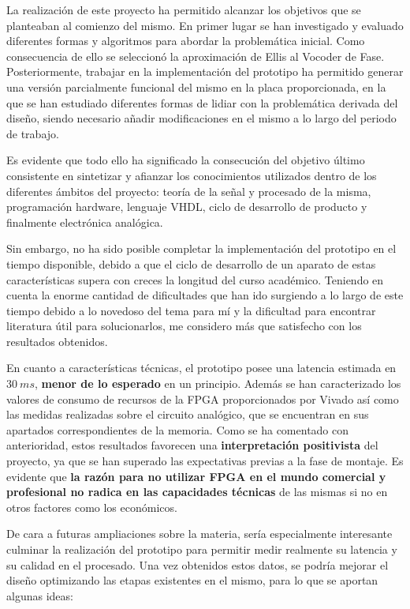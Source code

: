 La realización de este proyecto ha permitido alcanzar los objetivos que se planteaban al comienzo del mismo. En primer lugar se han investigado y evaluado diferentes formas y algoritmos para abordar la problemática inicial. Como consecuencia de ello se seleccionó la aproximación de Ellis al Vocoder de Fase. Posteriormente, trabajar en la implementación del prototipo ha permitido generar una versión parcialmente funcional del mismo en la placa proporcionada, en la que se han estudiado diferentes formas de lidiar con la problemática derivada del diseño, siendo necesario añadir modificaciones en el mismo a lo largo del periodo de trabajo. 

Es evidente que todo ello ha significado la consecución del objetivo último consistente en sintetizar y afianzar los conocimientos utilizados dentro de los diferentes ámbitos del proyecto: teoría de la señal y procesado de la misma, programación hardware, lenguaje VHDL, ciclo de desarrollo de producto y finalmente electrónica analógica.

Sin embargo, no ha sido posible completar la implementación del prototipo en el tiempo disponible, debido a que el ciclo de desarrollo de un aparato de estas características supera con creces la longitud del curso académico. Teniendo en cuenta la enorme cantidad de dificultades que han ido surgiendo a lo largo de este tiempo debido a lo novedoso del tema para mí y la dificultad para encontrar literatura útil para solucionarlos, me considero más que satisfecho con los resultados obtenidos.

En cuanto a características técnicas, el prototipo posee una latencia estimada en $30~ms$, \textbf{menor de lo esperado} en un principio. Además se han caracterizado los valores de consumo de recursos de la FPGA proporcionados por Vivado así como las medidas realizadas sobre el circuito analógico, que se encuentran en sus apartados correspondientes de la memoria. Como se ha comentado con anterioridad, estos resultados favorecen una \textbf{interpretación positivista} del proyecto, ya que se han superado las expectativas previas a la fase de montaje. Es evidente que \textbf{la razón para no utilizar FPGA en el mundo comercial y profesional no radica en las capacidades técnicas} de las mismas si no en otros factores como los económicos.

De cara a futuras ampliaciones sobre la materia, sería especialmente interesante culminar la realización del prototipo para permitir medir realmente su latencia y su calidad en el procesado. Una vez obtenidos estos datos, se podría mejorar el diseño optimizando las etapas existentes en el mismo, para lo que se aportan algunas ideas:

